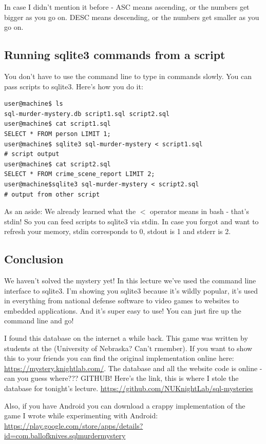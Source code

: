 \documentclass[12pt,a4paper]{article}
\begin{document}
In case I didn't mention it before - ASC means ascending, or the numbers get
bigger as you go on. DESC means descending, or the numbers get smaller as you go
on.

\subsection{Running sqlite3 commands from a script}
You don't have to use the command line to type in commands slowly. You can pass
scripts to sqlite3. Here's how you do it:

\begin{lstlisting}[style=term]
user@machine$ ls
sql-murder-mystery.db script1.sql script2.sql
user@machine$ cat script1.sql
SELECT * FROM person LIMIT 1;
user@machine$ sqlite3 sql-murder-mystery < script1.sql
# script output
user@machine$ cat script2.sql
SELECT * FROM crime_scene_report LIMIT 2;
user@machine$sqlite3 sql-murder-mystery	< script2.sql
# output from other script
\end{lstlisting}

As an aside: We already learned what the $<$ operator means in bash - that's stdin! So you
can feed scripts to sqlite3 via stdin. In case you forgot and want to refresh
your memory, stdin corresponds to 0, stdout is 1 and stderr is 2.

\subsection{Conclusion}
We haven't solved the mystery yet! In this lecture we've used the command line
interface to sqlite3. I'm showing you sqlite3 because it's wildly popular, it's
used in everything from national defense software to video games to websites to
embedded applications. And it's super easy to use! You can just fire up the
command line and go!

I found this database on the internet a while back. This game was written by
students at the (University of Nebraska? Can't rmember).
 If you want to show this to your friends you can find
the original implementation online here: \url{https://mystery.knightlab.com/}.
The database and all the website code is online -can you guess where??? GITHUB! 
Here's the link, this is where I stole the database for tonight's lecture.
\url{https://github.com/NUKnightLab/sql-mysteries}

Also, if you have Android you can download a crappy implementation of the game
I wrote while experimenting with Android:
\url{https://play.google.com/store/apps/details?id=com.ballofknives.sqlmurdermystery}
\end{document}
